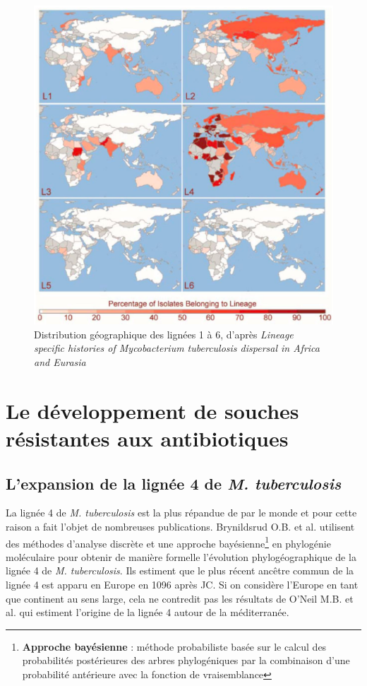 \documentclass[twoside,a4paper,11pt,frenchb,openany]{report}
\begin{document}
\begin{figure}
\centering
\includegraphics[scale=0.5]{world.png}
\caption{Distribution géographique des lignées 1 à 6, d'après \textit{Lineage\\ specific histories of Mycobacterium tuberculosis dispersal in Africa and Eurasia}}
\end{figure}


\section{Le développement de souches résistantes aux antibiotiques}

\subsection{L'expansion de la lignée 4 de \textit{M. tuberculosis}}


La lignée 4 de \textit{M. tuberculosis} est la plus répandue de par le monde et pour cette raison a fait l'objet de nombreuses publications. Brynildsrud O.B. et al.\cite{brynildsrud} utilisent des méthodes d'analyse discrète et une approche bayésienne\footnote{\textbf{Approche bayésienne} : méthode probabiliste basée sur le calcul des probabilités postérieures des arbres phylogéniques par la combinaison d'une probabilité antérieure avec la fonction de vraisemblance} en phylogénie moléculaire pour obtenir de manière formelle l'évolution phylogéographique de la lignée 4 de \textit{M. tuberculosis}. Ils estiment que le plus récent ancêtre commun de la lignée 4 est apparu en Europe en 1096 après JC. Si on considère l'Europe en tant que continent au sens large, cela ne contredit pas les résultats de O'Neil M.B. et al.\cite{oneil} qui estiment l'origine de la lignée 4 autour de la méditerranée.
\end{document}
